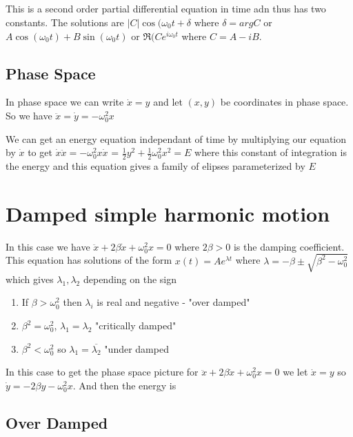 \documentclass{homework}
\begin{document}
\subsection{}
This is a second order partial differential equation in time adn thus has two constants. The solutions are
$|C|\cos(\omega_0 t + \delta$ where $\delta = arg C$ or $A \cos (\omega_0 t) + B \sin (\omega_0 t)$ or $\Re (Ce^{i\omega_0 t}$ where $C = A - iB$.




\subsection{Phase Space}
In phase space we can write $\dot x = y$ and let $(x,y)$ be coordinates in phase space. So we have $\ddot x = \dot y =  -\omega_0^2 x$

We can get an energy equation independant of time by multiplying our equation by $\dot x$ to get $\dot x \ddot x = -\omega_0^2 x \dot x$ = $\frac{1}{2}y^2 + \frac{1}{2}\omega_0^2x^2 = E$ where this constant of integration is the energy and this equation gives a family of elipses parameterized by $E$




\section{Damped simple harmonic motion}
In this case we have $\ddot x + 2\beta \dot x + \omega_0^2 x = 0$ where $2\beta >0$ is the damping coefficient. This equation has solutions of the form $x(t) = Ae^{\lambda t}$ where $\lambda = -\beta \pm \sqrt{\beta^2 - \omega_0^2}$ which gives $\lambda_1, \lambda_2$ depending on the sign

\begin{enumerate}
    \item  If $\beta > \omega_0^2$ then $\lambda_i$ is real and negative - "over damped"
    \item $\beta^2 = \omega_0^2$, $\lambda_1 = \lambda_2$ "critically damped"
    \item $\beta^2 < \omega_0^2$ so $\lambda_1 = \overline{\lambda_2}$ "under damped
\end{enumerate}


In this case to get the phase space picture for $\ddot x + 2\beta \dot x + \omega_0^2 x = 0$ we let $\dot x = y$ so $\dot y = -2\beta y - \omega_0^2x$. And then the energy is 

\subsection{Over Damped}
\end{document}
